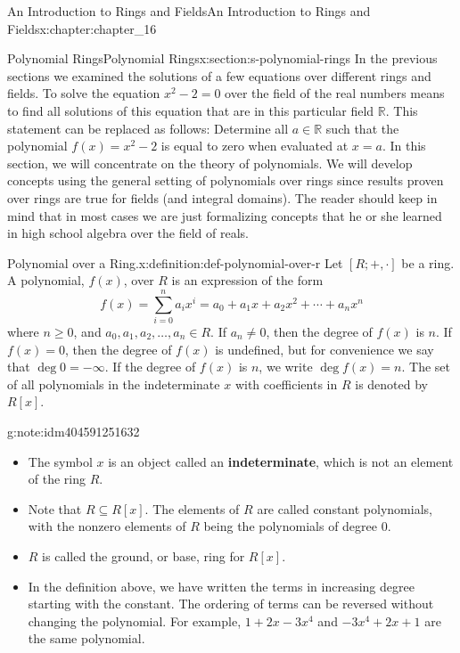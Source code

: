 \documentclass[twoside,10pt,]{book}
\newcommand{\terminology}[1]{\textbf{#1}}
\numberwithin{equation}{section}
\begin{document}
\begin{chapterptx}{An Introduction to Rings and Fields}{}{An Introduction to Rings and Fields}{}{}{x:chapter:chapter_16}
\begin{sectionptx}{Polynomial Rings}{}{Polynomial Rings}{}{}{x:section:s-polynomial-rings}
In the previous sections we examined the solutions of a few equations over different rings and fields. To solve the equation \(x^2- 2 = 0\) over the field of the real numbers means to find all solutions of this equation that are in this particular field \(\mathbb{R}\). This statement can be replaced as follows: Determine all \(a \in  \mathbb{R}\) such that the polynomial \(f(x) = x^2 - 2\) is equal to zero when evaluated at \(x=a\). In this section, we will concentrate on  the theory of polynomials. We will develop concepts using the general setting of polynomials over rings since results proven over rings are true for fields (and integral domains). The reader should keep in mind that in most cases we are just formalizing concepts that he or she learned in high school algebra over the field of reals.%
\begin{definition}{Polynomial over a Ring.}{x:definition:def-polynomial-over-r}%
%
\label{g:notation:idm404591254400}%
\label{g:notation:idm404591253936}%
Let \([R; +, \cdot ]\) be a ring.  A polynomial, \(f(x)\), over \(R\) is an expression of the form%
\begin{equation*}
f(x)=\sum _{i=0}^n a_i x^i=a_0 + a_1 x+a_2 x^2+ \cdots +a_n x^n
\end{equation*}
where \(n\geq 0\), and \(a_0, a_1, a_2, \ldots, a_n \in  R\).  If  \(a_n \neq  0\),  then the degree of \(f(x)\) is \(n\).  If \(f(x) = 0\), then the degree of \(f(x)\) is undefined, but for convenience we say that \(\deg 0 = -\infty\).  If the degree of \(f(x)\) is \(n\), we write \(\deg f(x) = n\). The set of all polynomials in the indeterminate \(x\) with coefficients in \(R\) is denoted by \(R[x]\).%
\end{definition}
\begin{note}{}{g:note:idm404591251632}%
%
\begin{itemize}[label=\textbullet]
\item{}The symbol \(x\) is an object called an \terminology{indeterminate}, which is not an element of the ring \(R\).%
\item{}Note that \(R\subseteq  R[x]\). The elements of \(R\) are called constant polynomials, with the nonzero elements of \(R\) being the polynomials of degree 0.%
\item{}\(R\) is called the ground, or base, ring for \(R[x]\).%
\item{}In the definition above, we have written the terms in increasing degree starting with the constant.  The ordering of terms can be reversed without changing the polynomial.  For example,  \(1 + 2 x -3x^4\) and  \(-3x^4+2 x+1\) are the same polynomial.%

\end{itemize}
\end{note}
\end{sectionptx}
\end{chapterptx}
\end{document}
